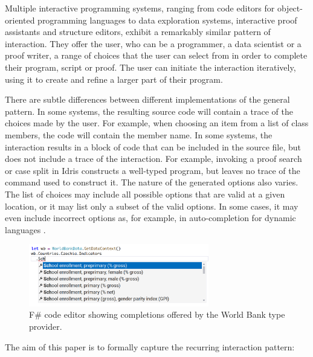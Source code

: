 \documentclass[anonymous, a4paper,UKenglish,cleveref, autoref, thm-restate]{lipics-v2021}
\begin{document}
Multiple interactive programming systems, ranging from code editors for object-oriented programming
languages to data exploration systems, interactive proof assistants and structure editors, exhibit a
remarkably similar pattern of interaction. They offer the user, who can be a programmer, a data scientist
or a proof writer, a range of choices that the user can select from in order to complete their
program, script or proof. The user can initiate the interaction iteratively, using it to
create and refine a larger part of their program.

There are subtle differences between different implementations of the general pattern. In some
systems, the resulting source code will contain a trace of the choices made by the user.
For example, when choosing an item from a list of class members, the code will contain the member
name. In some systems, the interaction results in a block of code that can be included in the
source file, but does not include a trace of the interaction. For example, invoking a proof search
or case split in Idris \cite{brady-2015-idris} constructs a well-typed program, but leaves no trace
of the command used to construct it.
%
The nature of the generated options also varies. The list of choices may include all possible
options that are valid at a given location, or it may list only a subset of the valid options.
In some cases, it may even include incorrect options as, for example, in auto-completion
for dynamic languages \cite{frolich-2024-autocomplete}.

\begin{figure}[t]
  \includegraphics[width=0.7\textwidth]{fig/worldbank.png}
  \caption{F\# code editor showing completions offered by the World Bank type provider.}
  \label{fig:worldbank}
\end{figure}

The aim of this paper is to formally capture the recurring interaction pattern:
\end{document}
